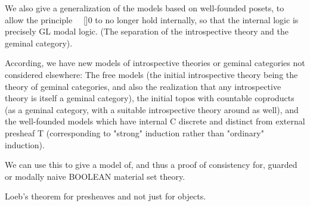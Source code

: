 We also give a generalization of the models based on well-founded posets, to allow the principle ~~[]0 to no longer hold internally, so that the internal logic is precisely GL modal logic. (The separation of the introspective theory and the geminal category).

According, we have new models of introspective theories or geminal categories not considered elsewhere: The free models (the initial introspective theory being the theory of geminal categories, and also the realization that any introspective theory is itself a geminal category), the initial topos with countable coproducts (as a geminal category, with a suitable introspective theory around as well), and the well-founded models which have internal C discrete and distinct from external presheaf T (corresponding to "strong" induction rather than "ordinary" induction).

We can use this to give a model of, and thus a proof of consistency for, guarded or modally naive BOOLEAN material set theory.

Loeb's theorem for presheaves and not just for objects.